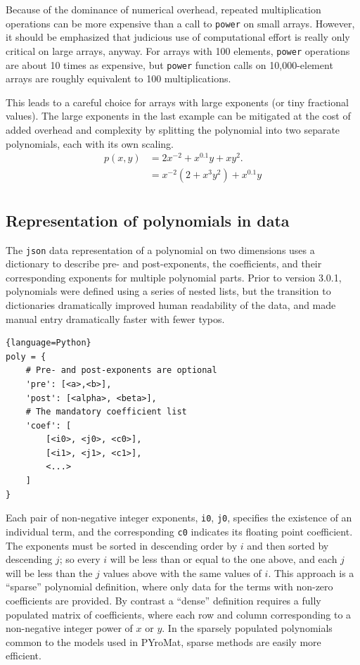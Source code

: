 Because of the dominance of numerical overhead, repeated multiplication operations can be more expensive than a call to \texttt{power} on small arrays.  However, it should be emphasized that judicious use of computational effort is really only critical on large arrays, anyway.  For arrays with 100 elements, \texttt{power} operations are about 10 times as expensive, but \texttt{power} function calls on 10,000-element arrays are roughly equivalent to 100 multiplications.

This leads to a careful choice for arrays with large exponents (or tiny fractional values).  The large exponents in the last example can be mitigated at the cost of added overhead and complexity by splitting the polynomial into two separate polynomials, each with its own scaling.
\begin{align}
p(x,y) &= 2x^{-2} + x^{0.1}y + xy^2.\nonumber\\
 &= x^{-2} \left(2 + x^3y^2 \right) + x^{0.1} y\nonumber\\
\end{align}

\subsection{Representation of polynomials in data}

The \texttt{json} data representation of a polynomial on two dimensions uses a dictionary to describe pre- and post-exponents, the coefficients, and their corresponding exponents for multiple polynomial parts.  Prior to version 3.0.1, polynomials were defined using a series of nested lists, but the transition to dictionaries dramatically improved human readability of the data, and made manual entry dramatically faster with fewer typos.

\begin{lstlisting}{language=Python}
poly = {
    # Pre- and post-exponents are optional
    'pre': [<a>,<b>],       
    'post': [<alpha>, <beta>],
    # The mandatory coefficient list
    'coef': [
        [<i0>, <j0>, <c0>],
        [<i1>, <j1>, <c1>],
        <...>
    ]
}
\end{lstlisting}

Each pair of non-negative integer exponents, \texttt{i0}, \texttt{j0}, specifies the existence of an individual term, and the corresponding \texttt{c0} indicates its floating point coefficient.  The exponents must be sorted in descending order by $i$ and then sorted by descending $j$; so every $i$ will be less than or equal to the one above, and each $j$ will be less than the $j$ values above with the same values of $i$.  This approach is a ``sparse'' polynomial definition, where only data for the terms with non-zero coefficients are provided.  By contrast a ``dense'' definition requires a fully populated matrix of coefficients, where each row and column corresponding to a non-negative integer power of $x$ or $y$.  In the sparsely populated polynomials common to the models used in PYroMat, sparse methods are easily more efficient.


